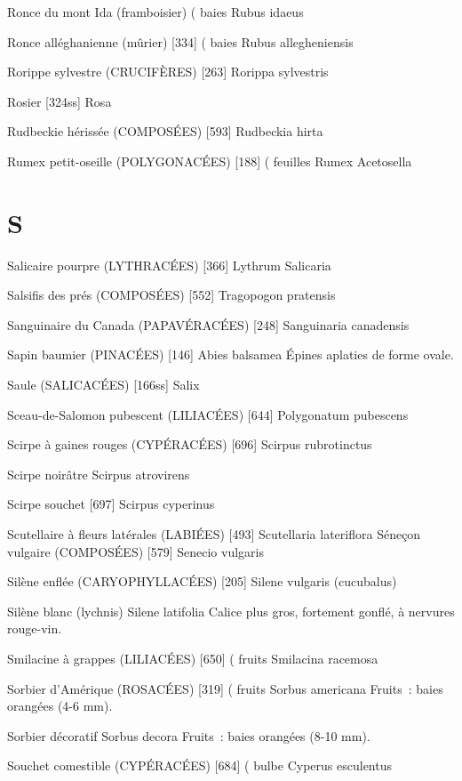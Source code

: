 Ronce du mont Ida (framboisier)				( baies
				Rubus idaeus


Ronce alléghanienne (mûrier)  [334]				( baies
				Rubus allegheniensis

Rorippe sylvestre (CRUCIFÈRES)  [263]
				Rorippa sylvestris

Rosier  [324ss]
				Rosa

Rudbeckie hérissée (COMPOSÉES)  [593]
				Rudbeckia hirta

Rumex petit-oseille (POLYGONACÉES)  [188]		( feuilles
				Rumex Acetosella

\chapter*{S}

Salicaire pourpre (LYTHRACÉES)  [366]
				Lythrum Salicaria

Salsifis des prés (COMPOSÉES)  [552]
				Tragopogon pratensis


Sanguinaire du Canada (PAPAVÉRACÉES)  [248]
				Sanguinaria canadensis

Sapin baumier (PINACÉES) [146]
				Abies balsamea
Épines aplaties de forme ovale.

Saule (SALICACÉES)  [166ss]
				Salix

Sceau-de-Salomon pubescent (LILIACÉES)  [644]
				Polygonatum pubescens

Scirpe à gaines rouges (CYPÉRACÉES)  [696]
				Scirpus rubrotinctus

Scirpe noirâtre
				Scirpus atrovirens

Scirpe souchet  [697]
				Scirpus cyperinus

Scutellaire à fleurs latérales (LABIÉES)  [493]
				Scutellaria lateriflora
Séneçon vulgaire (COMPOSÉES)  [579]
				Senecio vulgaris

Silène enflée (CARYOPHYLLACÉES)  [205]
				Silene vulgaris (cucubalus)

Silène blanc (lychnis)
				Silene latifolia
Calice plus gros, fortement gonflé, à nervures rouge-vin.

Smilacine à grappes (LILIACÉES)  [650]			( fruits
				Smilacina racemosa

Sorbier d’Amérique (ROSACÉES)  [319]			( fruits
				Sorbus americana
Fruits : baies orangées (4-6 mm).

Sorbier décoratif
				Sorbus decora
Fruits : baies orangées (8-10 mm).

Souchet comestible (CYPÉRACÉES)  [684]			( bulbe
				Cyperus esculentus

